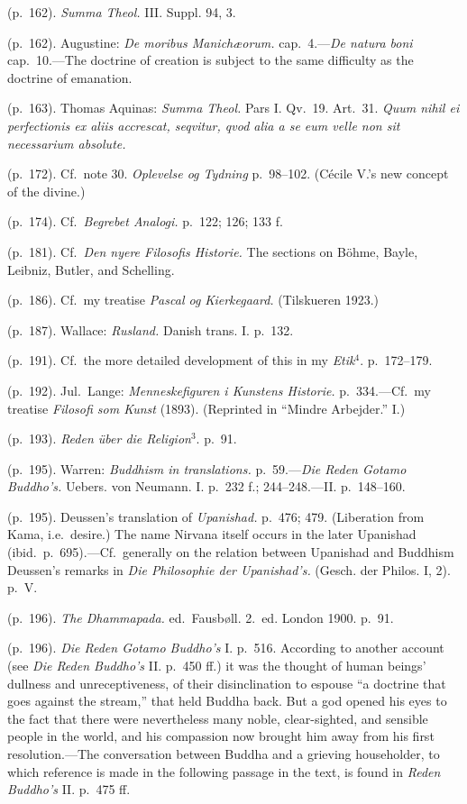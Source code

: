 \documentclass[12pt,a4paper]{book}
\newcommand{\opage}[1]{\marginnote{\footnotesize\textit{[#1]}}}
\begin{document}
 (p.~162). \emph{Summa Theol.} III. Suppl. 94, 3.

 (p.~162). Augustine: \emph{De moribus Manichæorum.} cap.~4.---\emph{De natura boni} cap.~10.---The
doctrine of creation is subject to the same difficulty as the doctrine of emanation.

\opage{254}(p.~163). Thomas Aquinas: \emph{Summa Theol.} Pars I. Qv.~19. Art.~31. \emph{Quum nihil ei perfectionis
ex aliis accrescat, seqvitur, qvod alia a se eum velle non sit necessarium absolute.}

 (p.~172). Cf.\ note 30. \emph{Oplevelse og Tydning} p.~98--102. (Cécile V.'s new concept of the divine.)

 (p.~174). Cf.\ \emph{Begrebet Analogi.} p.~122; 126; 133 f.

 (p.~181). Cf.\ \emph{Den nyere Filosofis Historie.} The sections on Böhme, Bayle, Leibniz, Butler, and
Schelling.

 (p.~186). Cf.\ my treatise \emph{Pascal og Kierkegaard.} (Tilskueren 1923.)

 (p.~187). Wallace: \emph{Rusland.} Danish trans. I. p.~132.

 (p.~191). Cf.\ the more detailed development of this in my \emph{Etik}$^4$. p.~172--179.

 (p.~192). Jul.\ Lange: \emph{Menneskefiguren i Kunstens Historie.} p.~334.---Cf.\ my treatise
\emph{Filosofi som Kunst} (1893). (Reprinted in ``Mindre Arbejder.'' I.)

 (p.~193). \emph{Reden über die Religion}$^3$. p.~91.

 (p.~195). Warren: \emph{Buddhism in translations.} p.~59.---\emph{Die Reden Gotamo Buddho's.} Uebers.
von Neumann. I. p.~232 f.; 244--248.---II. p.~148--160.

 (p.~195). Deussen's translation of \emph{Upanishad.} p.~476; 479. (Liberation from Kama, i.e.\ desire.)
The name Nirvana itself occurs in the later Upanishad (ibid.\ p.~695).---Cf.\ generally on the relation
between Upanishad and Buddhism Deussen's remarks in \emph{Die Philosophie der Upanishad's.} (Gesch. der
Philos. I, 2). p.~V.

 (p.~196). \emph{The Dhammapada.} ed.\ Fausbøll. 2.\ ed. London 1900. p.~91.

 (p.~196). \emph{Die Reden Gotamo Buddho's} I. p.~516. According to another account (see \emph{Die Reden
Buddho's} II. p.~450 ff.) it was the thought of human beings' dullness and unreceptiveness, of their
disinclination to espouse ``a doctrine that goes against the stream,'' that held Buddha back. But a god
opened his eyes to the fact that there were nevertheless many noble, clear-sighted, and sensible people
in the world, and his compassion now brought him away from his first resolution.---The conversation
between Buddha and a grieving householder, to which reference is made in the following passage in the
text, is found in \emph{Reden Buddho's} II. p.~475 ff.
\end{document}
